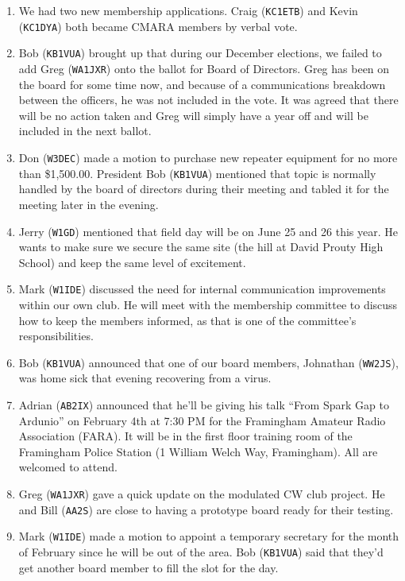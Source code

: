 \documentclass[10pt,letterpaper]{article}
\begin{document}
\begin{enumerate}
\item We had two new membership applications. Craig (\texttt{KC1ETB}) and Kevin (\texttt{KC1DYA}) both became CMARA members by verbal vote.

\item Bob (\texttt{KB1VUA}) brought up that during our December elections, we failed to add Greg (\texttt{WA1JXR}) onto the ballot for Board of Directors. Greg has been on the board for some time now, and because of a communications breakdown between the officers, he was not included in the vote. It was agreed that there will be no action taken and Greg will simply have a year off and will be included in the next ballot.

\item Don (\texttt{W3DEC}) made a motion to purchase new repeater equipment for no more than \$1,500.00. President Bob (\texttt{KB1VUA}) mentioned that topic is normally handled by the board of directors during their meeting and tabled it for the meeting later in the evening.

\item Jerry (\texttt{W1GD}) mentioned that field day will be on June 25 and 26 this year. He wants to make sure we secure the same site (the hill at David Prouty High School) and keep the same level of excitement.

\item  Mark (\texttt{W1IDE}) discussed the need for internal communication improvements within our own club. He will meet with the membership committee to discuss how to keep the members informed, as that is one of the committee's responsibilities.

\item Bob (\texttt{KB1VUA}) announced that one of our board members, Johnathan (\texttt{WW2JS}), was home sick that evening recovering from a virus.

\item Adrian (\texttt{AB2IX}) announced that he'll be giving his talk ``From Spark Gap to Ardunio'' on February 4th at 7:30 PM for the Framingham Amateur Radio Association (FARA). It will be in the first floor training room of the Framingham Police Station (1 William Welch Way, Framingham). All are welcomed to attend.

\item Greg (\texttt{WA1JXR}) gave a quick update on the modulated CW club project. He and Bill (\texttt{AA2S}) are close to having a prototype board ready for their testing.

\item Mark (\texttt{W1IDE}) made a motion to appoint a temporary secretary for the month of February since he will be out of the area. Bob (\texttt{KB1VUA}) said that they'd get another board member to fill the slot for the day.
\end{enumerate}
\end{document}
